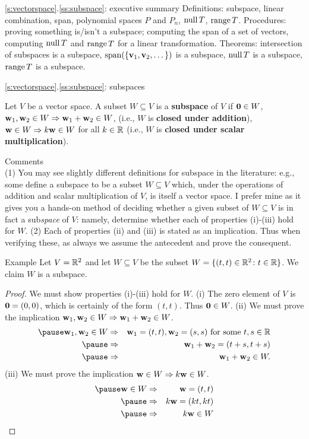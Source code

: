 \begin{frame}{\ref{s:vectorspace}.\ref{ss:subspace}: executive summary}
\alert{Definitions:} subspace, linear combination, span, polynomial spaces $P$ and $P_n$, $\operatorname{null} T$, $\operatorname{range} T$. 
\bspace
\alert{Procedures:} proving something is/isn't a subspace; computing the span of a set of vectors, computing $\operatorname{null} T$ and $\operatorname{range} T$ for a linear transformation. 
\bspace
\alert{Theorems:} intersection of subspaces is a subspace, $\operatorname{span}(\{{\mathbf v}_1,{\mathbf v}_2,\dots\})$ is a subspace, $\operatorname{null} T$ is a subspace, $\operatorname{range} T$ is a subspace.
\end{frame}
\begin{frame}{\ref{s:vectorspace}.\ref{ss:subspace}: subspaces}\footnotesize
\begin{definition}
Let $V$ be a vector space. A subset $W\subseteq V$ is a {\bf subspace} of $V$ if
\bb[(i)]
\ii ${\mathbf 0}\in W$,
\ii ${\mathbf w}_1, {\mathbf w}_2\in W\Rightarrow {\mathbf w}_1+{\mathbf w}_2\in W$, (i.e., $W$ is {\bf closed under addition}),
\ii ${\mathbf w}\in W\Rightarrow k{\mathbf w}\in W$ for all $k\in{\mathbb R}$ (i.e., $W$ is {\bf closed under scalar multiplication}). 
\ee 
\end{definition}
\pause
\alert{Comments}\\
(1) You may see slightly different definitions for subspace in the literature: e.g., some define a subspace to be a subset $W\subseteq  V$ which, under the operations of addition and scalar multiplication of $V$, is itself a vector space. I prefer mine as it gives you a hands-on method of deciding whether a given subset of $W\subseteq V$ is in fact a sub{\em space} of $V$: namely, determine whether each of properties (i)-(iii) hold for $W$.
\bpause
(2) Each of properties (ii) and (iii) is stated as an \alert{implication}. Thus when verifying these, as always we assume the antecedent and prove the consequent.     
\end{frame}
\begin{frame}{Example}
\footnotesize
Let $V={\mathbb R}^2$ and let $W\subseteq V$ be the subset $W=\{(t,t)\in{\mathbb R}^2
\colon t\in{\mathbb R}\}$. We claim $W$ is a subspace. 
\pause \begin{proof}
We must show properties (i)-(iii) hold for $W$. 
\bpause
(i) The zero element of $V$ is ${\mathbf 0}=(0,0)$, which is certainly of the form $(t,t)$. Thus ${\mathbf 0}\in W$. 
\bpause
(ii) We must prove the implication ${\mathbf w}_1, {\mathbf w}_2\in W\Rightarrow {\mathbf w}_1+{\mathbf w}_2\in W$. 
\begin{eqnarray*}
\pause\boldw_1,\boldw_2\in W&\Rightarrow& \boldw_1=(t,t), \boldw_2=(s,s) \text{ for some $t,s\in\R$}\\
\pause&\Rightarrow&\boldw_1+\boldw_2=(t+s,t+s) \\
\pause&\Rightarrow&\boldw_1+\boldw_2\in W.
\end{eqnarray*}
\pause
(iii) We must prove the implication ${\mathbf w}\in W\Rightarrow k{\mathbf w}\in W$. 
\begin{eqnarray*}
\pause \boldw\in W&\Rightarrow& \boldw=(t,t)\\
\pause&\Rightarrow& k\boldw=(kt,kt)\\
\pause&\Rightarrow& k\boldw\in W
\end{eqnarray*}
\end{proof}
\end{frame}

